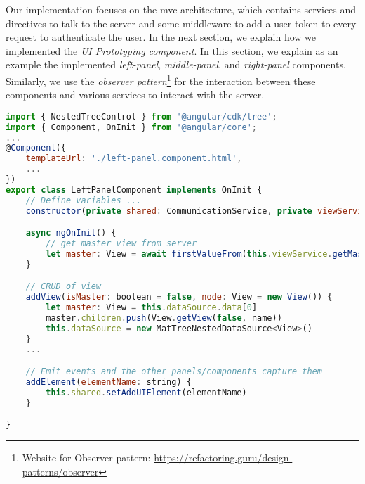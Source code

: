 Our implementation focuses on the \ac{mvc} architecture, which contains services and directives to talk to the server and some middleware to add a user token to every request to authenticate the user. In the next section, we explain how we implemented the \textit{UI Prototyping component}.
In this section, we explain as an example the implemented \textit{left-panel}, \textit{middle-panel}, and \textit{right-panel} components. 
Similarly, we use the \textit{observer pattern}\footnote{Website for Observer pattern: \url{https://refactoring.guru/design-patterns/observer}} for the interaction between these components and various services to interact with the server.

\begin{lstlisting}[language=JavaScript, caption=The Typescript File for the Left Panel, label=listing:implementation:left]
import { NestedTreeControl } from '@angular/cdk/tree';
import { Component, OnInit } from '@angular/core';
...
@Component({
    templateUrl: './left-panel.component.html',
    ...
})
export class LeftPanelComponent implements OnInit {
    // Define variables ...
    constructor(private shared: CommunicationService, private viewService: ViewsService, ...) { }

    async ngOnInit() {
        // get master view from server
        let master: View = await firstValueFrom(this.viewService.getMasterView())
    }

    // CRUD of view
    addView(isMaster: boolean = false, node: View = new View()) {
        let master: View = this.dataSource.data[0]
        master.children.push(View.getView(false, name))
        this.dataSource = new MatTreeNestedDataSource<View>()
    }
    ...

    // Emit events and the other panels/components capture them
    addElement(elementName: string) {
        this.shared.setAddUIElement(elementName)
    }

}    
\end{lstlisting}
